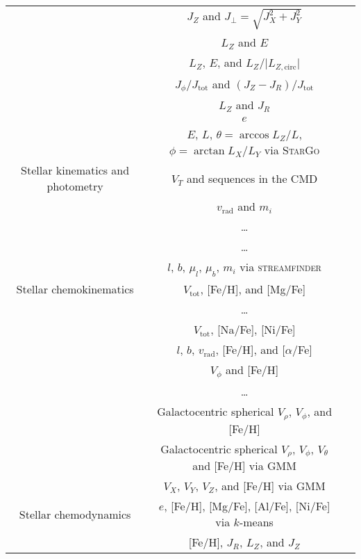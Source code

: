 \begin{table*}
\begin{tabular}{c|c|c}
        & $J_Z$ and $J_\perp = \sqrt{J_X^2 + J_Y^2}$ & \citet{Helmi1999} \\
        & $L_Z$ and $E$ & \citet{Helmi2017, Helmi2018} \\
        & $L_Z$, $E$, and $L_Z/\vert L_{Z,\text{circ}} \vert$ & \citet{Koppelman2019} \\
        & $J_\phi / J_\text{tot}$ and $(J_Z - J_R) / J_\text{tot}$ & \citet{Myeong2019} \\
        & $L_Z$ and $J_R$ & \citet{Feuillet2020} \\
        & $e$ & \citet{Naidu2020} \\
        & $E$, $L$, $\theta = \arccos{L_Z/L}$, $\phi = \arctan{L_X/L_Y}$ via \textsc{StarGo} & \citet{Yuan2020} \\
        \hline
        Stellar kinematics and photometry & $V_T$ and sequences in the CMD & \citet{Babusiaux2018} \\
        & $v_\text{rad}$ and $m_i$ & \citet{Ibata1994} \\
        & \dots & \citet{Haywood2018b} \\
        & \dots & \citet{Gallart2019} \\
        & $l$, $b$, $\mu_l$, $\mu_b$, $m_i$ via \textsc{streamfinder} & \citet{Malhan2018} \\
        \hline
        Stellar chemokinematics & $V_\text{tot}$, [Fe/H], and [Mg/Fe] & \citet{Nissen2010} \\
        & \dots & \citet{Navarro2011} \\
        & $V_\text{tot}$, [Na/Fe], [Ni/Fe] & \citet{Bensby2014} \\
        & $l$, $b$, $v_\text{rad}$, [Fe/H], and [$\alpha$/Fe] & \citet{Hawkins2015} \\
        & $V_\phi$ and [Fe/H] & \citet{Belokurov2020} \\
        & \dots & \citet{An2021b} \\
        & Galactocentric spherical $V_\rho$, $V_\phi$, and [Fe/H] & \citet{Belokurov2018} \\
        & Galactocentric spherical $V_\rho$, $V_\phi$, $V_\theta$ and [Fe/H] via GMM & \citet{Myeong2018c} \\
        & $V_X$, $V_Y$, $V_Z$, and [Fe/H] via GMM & \citep{Nikakhtar2021} \\
        \hline
        Stellar chemodynamics & $e$, [Fe/H], [Mg/Fe], [Al/Fe], [Ni/Fe] via $k$-means & \citet{Mackereth2019} \\
        & [Fe/H], $J_R$, $L_Z$, and $J_Z$ & \citet{Myeong2018b} \\

\end{tabular}
\end{table*}
